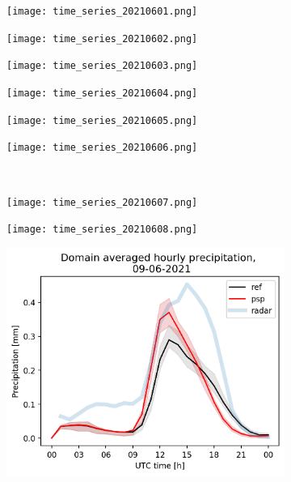 \documentclass[10pt]{article}
\begin{document}
\begin{figure}[!h]
    \centering
    \begin{subfigure}[b]{0.166\linewidth}
        \centering
        \texttt{[image: time\_series\_20210601.png]}
    \end{subfigure}%
        \begin{subfigure}[b]{0.166\linewidth}
        \centering
        \texttt{[image: time\_series\_20210602.png]}
    \end{subfigure}%
    \begin{subfigure}[b]{0.166\linewidth}
        \centering
        \texttt{[image: time\_series\_20210603.png]}
    \end{subfigure}%
    \begin{subfigure}[b]{0.166\linewidth}
        \centering
        \texttt{[image: time\_series\_20210604.png]}
    \end{subfigure}%
    \begin{subfigure}[b]{0.166\linewidth}
        \centering
        \texttt{[image: time\_series\_20210605.png]}
    \end{subfigure}%
    \begin{subfigure}[b]{0.166\linewidth}
        \centering
        \texttt{[image: time\_series\_20210606.png]}
    \end{subfigure}
    \\
        \begin{subfigure}[b]{0.166\linewidth}
        \centering
        \texttt{[image: time\_series\_20210607.png]}
    \end{subfigure}%
    \begin{subfigure}[b]{0.166\linewidth}
        \centering
        \texttt{[image: time\_series\_20210608.png]}
    \end{subfigure}%
    \begin{subfigure}[b]{0.166\linewidth}
        \centering
        \includegraphics[width=\textwidth]{time_series_20210609.png}

\end{subfigure}
\end{figure}
\end{document}
